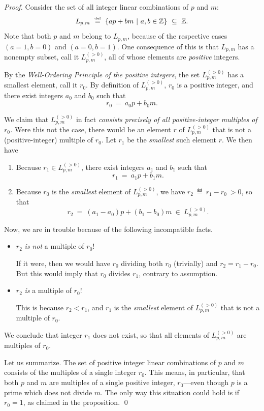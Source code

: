 \begin{proof}
Consider the set of all integer linear combinations of $p$ and $m$:
\[  L_{p,m} \ \stackrel{\mbox{{\tiny def}}}{=} \   \{ ap +bm \ | \ a, b \in \mathbb{Z} \} \ \subseteq \ \mathbb{Z}. \]
Note that both $p$ and $m$ belong to $L_{p,m}$, because of the
respective cases $(a=1, b=0)$ and $(a=0, b=1)$.  One consequence of
this is that $L_{p,m}$ has a nonempty subset, call it
$L^{(>0)}_{p,m}$, all of whose elements are {\em positive} integers.

By the {\it Well-Ordering Principle of the positive integers}, the set
$L^{(>0)}_{p,m}$ has a smallest element, call it $r_0$.  By definition
of $L^{(>0)}_{p,m}$, $r_0$ is a positive integer, and there exist
integers $a_0$ and $b_0$ such that
\[  r_0 \ = \ a_0 p + b_0 m. \]

We claim that $L^{(>0)}_{p,m}$ in fact {\em consists precisely of all
  positive-integer multiples of $r_0$.}  Were this not the case, there
would be an element $r$ of $L^{(>0)}_{p,m}$ that is not a
(positive-integer) multiple of $r_0$.  Let $r_1$ be the {\em smallest}
such element $r$.  We then have
\begin{enumerate}
\item
Because $r_1 \in L^{(>0)}_{p,m}$, there exist integers $a_1$ and $b_1$
such that
\[  r_1 \ = \ a_1 p + b_1 m. \]
\item
Because $r_0$ is the {\em smallest} element of $L^{(>0)}_{p,m}$, we
have $r_2 \ \eqdef \ r_1 - r_0 \ > 0$, so that
\[ r_2 \ = \ (a_1 - a_0) p + (b_1 -b_0) m \ \in \ L^{(>0)}_{p,m}. \]
\end{enumerate}
Now, we are in trouble because of the following incompatible facts.
\begin{itemize}
\item
$r_2$ {\em is not} a multiple of $r_0$!

If it were, then we would have $r_0$ dividing both $r_0$ (trivially)
and $r_2 = r_1 - r_0$.  But this would imply that $r_0$ divides $r_1$,
contrary to assumption.

\item
$r_2$ {\em is} a multiple of $r_0$!

This is because $r_2 < r_1$, and $r_1$ is the {\em smallest} element
of $L^{(>0)}_{p,m}$ that is not a multiple of $r_0$.
\end{itemize}
We conclude that integer $r_1$ does not exist, so that all elements of
$L^{(>0)}_{p,m}$ are multiples of $r_0$.

Let us summarize.  The set of positive integer linear combinations of
$p$ and $m$ consists of the multiples of a single integer $r_0$.  This
means, in particular, that both $p$ and $m$ are multiples of a single
positive integer, $r_0$---even though $p$ is a prime which does not
divide $m$.  The only way this situation could hold is if $r_0 = 1$,
as claimed in the proposition.  \qed
\end{proof}

